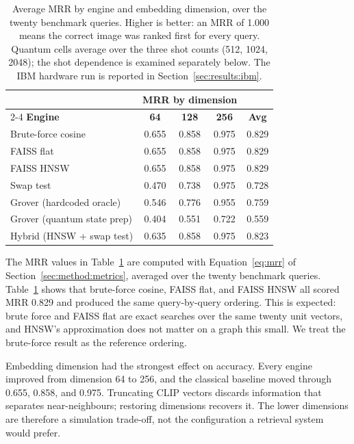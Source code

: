 \begin{table}[htbp]
  \centering
  \caption[Mean Reciprocal Rank by engine and dimension]{Average MRR by engine and embedding
  dimension, over the twenty benchmark queries. Higher is better: an MRR of
  1.000 means the correct image was ranked first for every query. Quantum
  cells average over the three shot counts (512, 1024, 2048); the shot
  dependence is examined separately below. The IBM hardware run is reported
  in Section~\ref{sec:results:ibm}.}
  \label{tab:mrr}
  \begin{tabularx}{\linewidth}{Xcccc}
    \toprule
    & \multicolumn{3}{c}{\textbf{MRR by dimension}} & \\
    \cmidrule(lr){2-4}
    \textbf{Engine} & \textbf{64} & \textbf{128} & \textbf{256} & \textbf{Avg} \\
    \midrule
    Brute-force cosine          & 0.655 & 0.858 & 0.975 & 0.829 \\
    FAISS flat                  & 0.655 & 0.858 & 0.975 & 0.829 \\
    FAISS HNSW                  & 0.655 & 0.858 & 0.975 & 0.829 \\
    \addlinespace
    Swap test                   & 0.470 & 0.738 & 0.975 & 0.728 \\
    Grover (hardcoded oracle)   & 0.546 & 0.776 & 0.955 & 0.759 \\
    Grover (quantum state prep) & 0.404 & 0.551 & 0.722 & 0.559 \\
    \addlinespace
    Hybrid (HNSW + swap test)   & 0.635 & 0.858 & 0.975 & 0.823 \\
    \bottomrule
  \end{tabularx}
\end{table}

The MRR values in Table~\ref{tab:mrr} are computed with
Equation~\ref{eq:mrr} of Section~\ref{sec:method:metrics}, averaged over the
twenty benchmark queries. Table~\ref{tab:mrr} shows that brute-force cosine,
FAISS flat, and FAISS HNSW all scored MRR 0.829 and produced the same
query-by-query ordering. This is
expected: brute force and FAISS flat are exact searches over the same twenty
unit vectors, and HNSW's approximation does not matter on a graph this small. We
treat the brute-force result as the reference ordering.

Embedding dimension had the strongest effect on accuracy. Every engine improved
from dimension 64 to 256, and the classical baseline moved through 0.655, 0.858,
and 0.975. Truncating CLIP vectors discards information that separates
near-neighbours; restoring dimensions recovers it. The lower dimensions are
therefore a simulation trade-off, not the configuration a retrieval system would
prefer.

